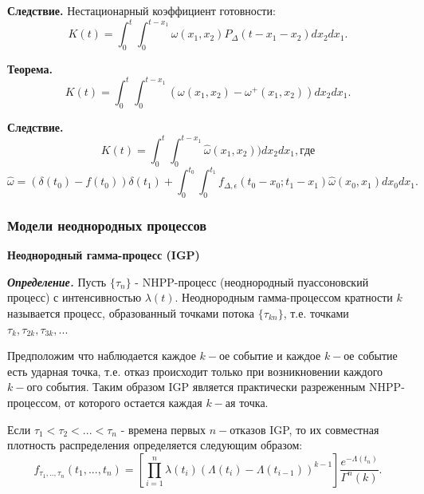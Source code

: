 {\bfseries Следствие.} Нестационарный коэффициент готовности:
\begin{equation}
K(t) = \int_0^t \int_0^{t - x_1} \omega(x_1, x_2) P_\Delta(t - x_1 - x_2) d x_2 d x_1.
\end{equation}

{\bfseries Теорема.}
\begin{equation}
K(t) = \int_0^t \int_0^{t - x_1}( \omega(x_1, x_2) -  \omega^+(x_1, x_2)) d x_2 d x_1.
\end{equation}

{\bfseries Следствие.}
\begin{equation}
K(t) = \int_0^t \int_0^{t - x_1}\widehat{\omega}(x_1, x_2)) d x_2 d x_1, где
\end{equation}
\begin{equation}
\widehat{\omega} = (\delta(t_0) - f(t_0))\delta(t_1) + \int_0^{t_0} \int_0^{t_1} f_{\Delta, \epsilon}(t_0 - x_0; t_1 - x_1)\widehat{\omega}(x_0, x_1) d x_0 d x_1.
\end{equation}

\begin{center}
\item\subsubsection{Модели неоднородных процессов}\hspace{4pt}
\end{center}

{\bfseries Неоднородный гамма-процесс (IGP)}

{\bfseries \textit{Определение.}} Пусть $\{\tau_n\}$ - NHPP-процесс (неоднородный пуассоновский процесс) с интенсивностью $\lambda(t)$. Неоднородным гамма-процессом кратности $k$ называется процесс, образованный точками потока $\{\tau_{kn}\}$, т.е. точками $\tau_{k}, \tau_{2k}, \tau_{3k}, ...$

Предположим что наблюдается каждое $k-ое$ событие и каждое $k-ое$ событие есть ударная точка, т.е. отказ происходит только при возникновении каждого $k-ого$ события. Таким образом IGP является практически разреженным NHPP-процессом, от которого остается каждая $k-ая$ точка.

Если $\tau_1 < \tau_2 < ... < \tau_n$ - времена первых $n - отказов$  IGP, то их совместная плотность распределения определяется следующим образом:
\begin{equation}
f_{\tau_1,..,\tau_n}(t_1, ..., t_n) = [\prod_{i=1}^n \lambda(t_i) (\Lambda(t_i) - \Lambda(t_{i-1}))^{k-1}] \frac{e^{-\Lambda(t_n)}}{\Gamma^n(k)}.
\end{equation}


